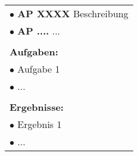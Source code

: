 \begin{table}[!h]
\begin{center}
\begin{tabular}{|p{35mm}||p{55mm}|p{50mm}||p{40mm}|}
   \multicolumn{4}{|p{150mm}|}{$\bullet$ \textbf{AP XXXX} Beschreibung}\\
   \multicolumn{4}{|p{150mm}|}{$\bullet$ \textbf{AP ....} ...}\\
   \multicolumn{4}{|p{150mm}|}{}\\
   \multicolumn{4}{|p{150mm}|}{\textbf{Aufgaben:}}\\
   \multicolumn{4}{|p{150mm}|}{$\bullet$ Aufgabe 1}\\
   \multicolumn{4}{|p{150mm}|}{$\bullet$ ...}\\
   \multicolumn{4}{|p{150mm}|}{}\\
   \multicolumn{4}{|p{150mm}|}{\textbf{Ergebnisse:}}\\
   \multicolumn{4}{|p{150mm}|}{$\bullet$ Ergebnis 1}\\
   \multicolumn{4}{|p{150mm}|}{$\bullet$ ...}\\
   \hline
  \end{tabular}
 \end{center}
\end{table}

